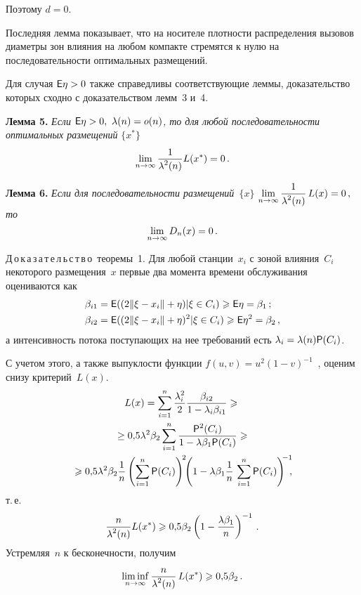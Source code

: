 \begin{multicols}{2}
Поэтому $d=0$. \hfill\sqq

Последняя лемма показывает, что на носителе плотности распределения вызовов диаметры зон влияния на 
любом компакте стремятся к нулю на последовательности оптимальных размещений.

Для случая ${{\sf E}}\eta>0$ также справедливы соответствующие леммы, доказательство 
которых сходно с доказательством лемм~3 и~4.

\medskip

\noindent
\textbf{Лемма 5.} \textit{Если ${{\sf E}} \eta>0,~ \lambda(n)=o(n)$, то для любой
последовательности оптимальных размещений} $\{x^*\}$
$$
\lim\limits_{n\rightarrow\infty}\displaystyle\frac{\displaystyle 1\mathstrut}{\displaystyle \lambda^2(n)\mathstrut}L(x^*)=0\,.
$$

\medskip

\noindent
\textbf{Лемма 6.} \textit{Если для последовательности размеще\-ний~$\{x\}$}
$\lim\limits_{n\rightarrow\infty} \displaystyle\frac{\displaystyle 1\mathstrut}{\displaystyle \lambda^2(n)\mathstrut}\,L(x)=0\,,$ 
\textit{то}
$$
\lim\limits_{n\rightarrow\infty} D_n(x)=0\,.
$$

\smallskip

\noindent
Д\,о\,к\,а\,з\,а\,т\,е\,л\,ь\,с\,т\,в\,о\ теоремы~1.
Для любой станции~$x_i$ с зоной влияния~$C_i$ некоторого размещения~$x$ первые два момента
времени обслуживания оцениваются как
\begin{align*}
\beta_{i1}&={{\sf E}} ((2\|\xi-x_i\|+\eta)|\xi\in C_i)\geqslant {\sf E}\eta=\beta_1\,;
\\
\beta_{i2}&={{\sf E}} ((2\|\xi-x_i\|+\eta)^2|\xi\in C_i)\geqslant {\sf E}\eta^2=\beta_2\,,
\end{align*}
а интенсивность потока поступающих на нее требований есть $\lambda_i=\lambda(n) {{\sf P}} (C_i)$.

С учетом этого, а также выпуклости функции $f(u,v)=u^2(1-v)^{-1}$~, оценим снизу
критерий~$L(x)$.
\begin{multline*}
L(x)=\suml{i=1}{n}\fr{\lambda_i^2}{2} \fr{\beta_{i2}} {1-\lambda_i \beta_{i1}}\geqslant{}\\
{}\ge
0{,}5\lambda^2\beta_2\suml{i=1}{n} \fr{{\p}^2(C_i)} {1-\lambda \beta_1 {\p}(C_i)}\geqslant{}\\
{}
\!\geqslant 0{,}5\lambda^2\beta_2 \fr{1}{n}\left(\suml{i=1}{n}{\p}(C_i)\right)^{\!2}\!\! \left(1-\lambda
\beta_1 \fr{1}{n}\,\suml{i=1}{n}{\p}(C_i)\right)^{\!\!-1}\!\!\!,\hspace*{-0.8pt}
\end{multline*}
т.\,е.
$$
\displaystyle\frac{\displaystyle n\mathstrut}{\displaystyle \lambda^2(n)\mathstrut}L(x^*)\geqslant 0{,}5\beta_2\left(1-\displaystyle\frac{\displaystyle \lambda \beta_1\mathstrut}{\displaystyle n\mathstrut}\right)^{-1}\,.
$$
Устремляя~$n$ к бесконечности, получим
$$
\liminf\limits_{n \to \infty}\displaystyle\frac{\displaystyle n\mathstrut}{\displaystyle \lambda^2(n)\mathstrut}\,L(x^*)\geqslant 0{,}5\beta_2\,.
$$
\smallskip


\end{multicols}
